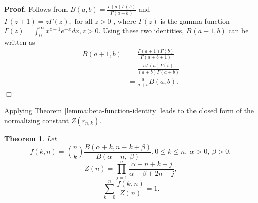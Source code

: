 \documentclass[officiallayout]{tktla}
\newtheorem{theorem}{Theorem}[chapter]
\newenvironment{proof}{\noindent\textbf{Proof.} }{$\Box$}
\begin{document}
\begin{proof}
  Follows from $B\left(a, b\right) = \frac{\Gamma\left(a\right)\Gamma\left(b\right)}{\Gamma\left(a + b\right)}$ \citep{artin_einfuhrung} and $\Gamma\left(z + 1\right) = z\Gamma\left(z\right), \text{ for all } z > 0$ \citep{davis_leonhard}, where $\Gamma\left(z\right)$ is the gamma function $\Gamma\left(z\right) = \int_{0}^{\infty}x^{z - 1}e^{-x}dx, z > 0$. Using these two identities, $B\left(a + 1, b\right)$ can be written as
  \begin{align*}
    B\left(a + 1, b\right) &= \frac{\Gamma\left(a + 1\right)\Gamma\left(b\right)}{\Gamma\left(a + b + 1\right)} \\
    &= \frac{a\Gamma\left(a\right)\Gamma\left(b\right)}{\left(a + b\right)\Gamma\left(a + b\right)} \\
    &= \frac{a}{a + b}B\left(a, b\right).
  \end{align*}
\end{proof}

Applying Theorem \ref{lemma:beta-function-identity} leads to the closed form of the normalizing constant $Z\left(r_{n, k}\right)$.
\begin{theorem}
  \label{theorem:likelihood-can-be-normalized}
  Let
  \[
  f\left(k, n\right) = \binom{n}{k}\frac{B\left(\alpha + k, n - k + \beta\right)}{B\left(\alpha + n, \: \beta\right)}, 0 \leq k \leq n, \: \alpha > 0, \: \beta > 0,
  \]
  \[
  Z\left(n\right) = \prod_{j = 1}^{n}\frac{\alpha + n + k - j}{\alpha + \beta + 2n - j},
  \]
  \[
  \sum_{k = 0}^{n}\frac{f\left(k, n\right)}{Z\left(n\right)} = 1.
  \]
\end{theorem}
\end{document}
